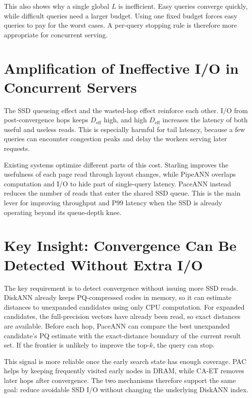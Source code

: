 This also shows why a single global $L$ is inefficient.
Easy queries converge quickly, while difficult queries need a larger budget.
Using one fixed budget forces easy queries to pay for the worst cases.
A per-query stopping rule is therefore more appropriate for concurrent serving.

\section{Amplification of Ineffective I/O in Concurrent Servers}
\label{sec:mot-tail}

The SSD queueing effect and the wasted-hop effect reinforce each other.
I/O from post-convergence hops keeps $D_\text{eff}$ high, and high $D_\text{eff}$ increases the latency of both useful and useless reads.
This is especially harmful for tail latency, because a few queries can encounter congestion peaks and delay the workers serving later requests\cite{dean2013tail}.

Existing systems optimize different parts of this cost.
Starling improves the usefulness of each page read through layout changes\cite{wang2024starling}, while PipeANN overlaps computation and I/O to hide part of single-query latency\cite{osdi25pipeann}.
PaceANN instead reduces the number of reads that enter the shared SSD queue.
This is the main lever for improving throughput and P99 latency when the SSD is already operating beyond its queue-depth knee.

\section{Key Insight: Convergence Can Be Detected Without Extra I/O}
\label{sec:mot-insight}

The key requirement is to detect convergence without issuing more SSD reads.
DiskANN already keeps PQ-compressed codes in memory, so it can estimate distances to unexpanded candidates using only CPU computation.
For expanded candidates, the full-precision vectors have already been read, so exact distances are available.
Before each hop, PaceANN can compare the best unexpanded candidate's PQ estimate with the exact-distance boundary of the current result set.
If the frontier is unlikely to improve the top-$k$, the query can stop.

This signal is more reliable once the early search state has enough coverage.
PAC helps by keeping frequently visited early nodes in DRAM, while CA-ET removes later hops after convergence.
The two mechanisms therefore support the same goal: reduce avoidable SSD I/O without changing the underlying DiskANN index.
